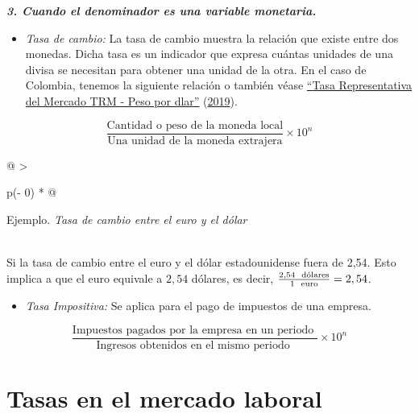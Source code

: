 \documentclass[
  11pt,
]{book}
\providecommand{\tightlist}{%
  \setlength{\itemsep}{0pt}\setlength{\parskip}{0pt}}
\begin{document}
\textbf{\emph{3. Cuando el denominador es una variable monetaria.}}

\begin{itemize}
\tightlist
\item
  \emph{Tasa de cambio:} La tasa de cambio muestra la relación que existe entre dos monedas. Dicha tasa es un indicador que expresa cuántas unidades de una divisa se necesitan para obtener una unidad de la otra. En el caso de Colombia, tenemos la siguiente relación o también véase \protect\hyperlink{ref-BibEntry2019Jun}{{``{Tasa Representativa del Mercado TRM - Peso por d{\ifmmode{}\fi}lar}''}} (\protect\hyperlink{ref-BibEntry2019Jun}{2019}).
\end{itemize}

\[\begin{equation}
\frac{\text{Cantidad o peso de la moneda local}}{\text{Una unidad de la moneda extrajera}}\times 10^{n}
\end{equation}\]

\begin{longtable}[]{@{}
  >{\raggedright\arraybackslash}p{(\columnwidth - 0\tabcolsep) * }@{}}
\toprule
\begin{minipage}[b]{\linewidth}\raggedright
Ejemplo. \emph{Tasa de cambio entre el euro y el dólar}
\end{minipage} \\
\midrule
\endhead
Si la tasa de cambio entre el euro y el dólar estadounidense fuera de 2,54. Esto implica a que el euro equivale a \(2,54\) dólares, es decir, \(\frac{2,54 \hspace{2mm} \text{dólares}}{1 \hspace{2mm}\text{euro}}= 2,54\). \\
\bottomrule
\end{longtable}

\begin{itemize}
\tightlist
\item
  \emph{Tasa Impositiva:} Se aplica para el pago de impuestos de una empresa.
\end{itemize}

\[\begin{equation}
\frac{\text{Impuestos pagados por la empresa en un periodo }}{\text{Ingresos obtenidos en el mismo periodo }}\times 10^{n}
\end{equation}\]

\hypertarget{tasas-en-el-mercado-laboral}{%
\section{Tasas en el mercado laboral}\label{tasas-en-el-mercado-laboral}}
\end{document}
